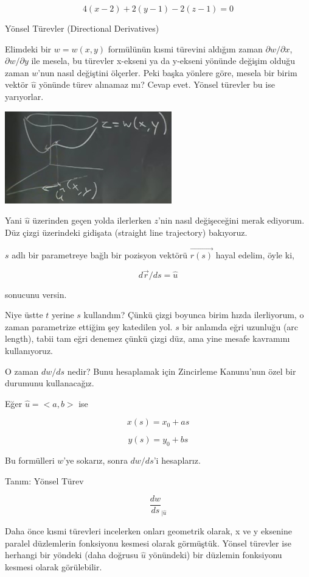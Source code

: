 \documentclass[12pt,fleqn]{article}\usepackage{../../common}
\begin{document}
$$ 4(x-2) + 2(y-1) - 2(z-1) = 0 $$

Yönsel Türevler (Directional Derivatives) 

Elimdeki bir $w = w(x,y)$ formülünün kısmi türevini aldığım zaman $\partial
w/\partial x$, $\partial w/\partial y$ ile mesela, bu türevler x-ekseni ya da
y-ekseni yönünde değişim olduğu zaman $w$'nun nasıl değiştini ölçerler. Peki
başka yönlere göre, mesela bir birim vektör $\hat{u}$ yönünde türev alınamaz mı?
Cevap evet. Yönsel türevler bu ise yarıyorlar.

\includegraphics[height=4cm]{12_6.jpg}

Yani $\hat{u}$ üzerinden geçen yolda ilerlerken $z$'nin nasıl değişeceğini merak
ediyorum. Düz çizgi üzerindeki gidişata (straight line trajectory) bakıyoruz.

$s$ adlı bir parametreye bağlı bir pozisyon vektörü $\vec{r(s)}$ hayal
edelim, öyle ki,

$$ d\vec{r}/ds = \hat{u} $$

sonucunu versin.

Niye üstte $t$ yerine $s$ kullandım? Çünkü çizgi boyunca birim hızda
ilerliyorum, o zaman parametrize ettiğim şey katedilen yol. $s$ bir anlamda eğri
uzunluğu (arc length), tabii tam eğri denemez çünkü çizgi düz, ama yine mesafe
kavramını kullanıyoruz.

O zaman $dw/ds$ nedir? Bunu hesaplamak için Zincirleme Kanunu'nun özel bir
durumunu kullanacağız.

Eğer $\hat{u} = <a,b>$ ise

$$ x(s) = x_0 + as $$

$$ y(s) = y_0 + bs $$

Bu formülleri $w$'ye sokarız, sonra $dw/ds$'i hesaplarız. 

Tanım: Yönsel Türev

$$ \frac{dw}{ds}_{|\hat{u}} $$

Daha önce kısmi türevleri incelerken onları geometrik olarak, x ve y
eksenine paralel düzlemlerin fonksiyonu kesmesi olarak görmüştük. Yönsel
türevler ise herhangi bir yöndeki (daha doğrusu $\hat{u}$ yönündeki) bir
düzlemin fonksiyonu kesmesi olarak görülebilir.
\end{document}
